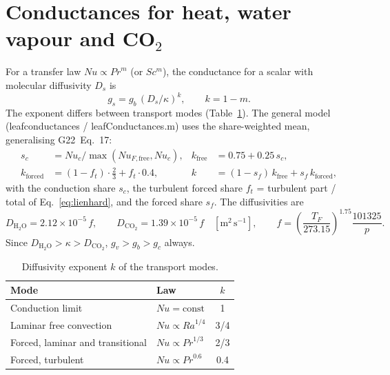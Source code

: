 \documentclass[11pt,a4paper]{article}
\newcommand{\Nu}{\mathit{Nu}}
\newcommand{\Ra}{\mathit{Ra}}
\newcommand{\Prn}{\mathit{Pr}}
\newcommand{\codeus}{\char95\allowbreak}
\DeclareRobustCommand{\code}[1]{\textnormal{\ttfamily\let\_\codeus #1}}
\newcommand{\Gtt}[1]{G22~Eq.~#1}
\begin{document}
\section{Conductances for heat, water vapour and CO\texorpdfstring{$_2$}{2}}\label{sec:scalar}
For a transfer law $\Nu\propto \Prn^{m}$ (or $Sc^{m}$), the conductance for a scalar with molecular diffusivity $D_s$ is
\begin{equation}
g_s = g_b\,(D_s/\kappa)^{k},\qquad k = 1 - m .
\end{equation}
The exponent differs between transport modes (Table~\ref{tab:kexp}). The general model (\code{leaf\_conductances} / \code{leafConductances.m}) uses the share-weighted mean, generalising \Gtt{17}:
\begin{align}
s_c &= \Nu_c/\max(\mathit{Nu}_{F,\mathrm{free}},\Nu_c), & k_{\mathrm{free}} &= 0.75 + 0.25\,s_c,\\
k_{\mathrm{forced}} &= (1-f_t)\cdot\tfrac23 + f_t\cdot0.4, &
k &= (1-s_f)\,k_{\mathrm{free}} + s_f\,k_{\mathrm{forced}},
\end{align}
with the conduction share $s_c$, the turbulent forced share $f_t$ = turbulent part / total of Eq.~\eqref{eq:lienhard}, and the forced share $s_f$. The diffusivities \citep{massman1998} are
\begin{equation}
D_{\mathrm{H_2O}} = \ensuremath{2.12\times10^{-5}}\,f,\qquad D_{\mathrm{CO_2}} = \ensuremath{1.39\times10^{-5}}\,f\quad[\mathrm m^2\,\mathrm s^{-1}],\qquad
f = \left(\frac{T_F}{273.15}\right)^{1.75}\frac{101325}{p}.
\end{equation}
Since $D_{\mathrm{H_2O}}>\kappa>D_{\mathrm{CO_2}}$, $g_v>g_b>g_c$ always.

\begin{table}[ht]
\centering\small
\caption{Diffusivity exponent $k$ of the transport modes.}\label{tab:kexp}
\begin{tabular}{llc}
\toprule
Mode & Law & $k$\\
\midrule
Conduction limit & $\Nu = \mathrm{const}$ & 1\\
Laminar free convection & $\Nu\propto\Ra^{1/4}$ & 3/4\\
Forced, laminar and transitional & $\Nu\propto\Prn^{1/3}$ & 2/3\\
Forced, turbulent & $\Nu\propto\Prn^{0.6}$ & 0.4\\
\bottomrule
\end{tabular}
\end{table}
\end{document}

